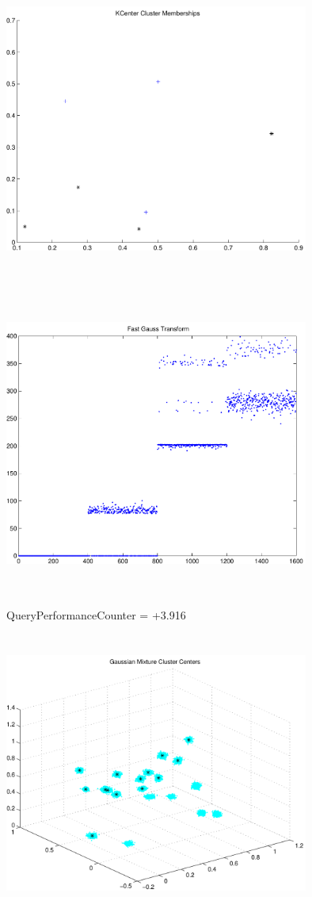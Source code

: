 \documentclass[9pt]{article}
\theoremstyle{plain}
\theoremstyle{definition}
\theoremstyle{remark}
\numberwithin{equation}{section}
\begin{document}
\includegraphics[width=10.0cm,height=10.0cm]{KCenterClusterMemberships_4_Centers.pdf}

\includegraphics[width=10.0cm,height=10.0cm]{FGT4_Centers.pdf}

QueryPerformanceCounter  =  +3.916
\includegraphics[width=10.0cm,height=10.0cm]{GaussianMixture_ClusterCenters20_Centers.pdf}
\end{document}
